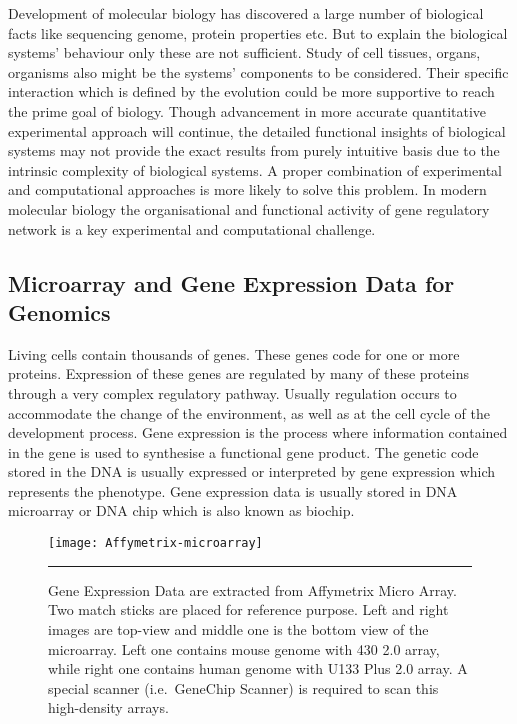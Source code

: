 Development of molecular biology has discovered a large number of biological facts like sequencing genome, protein properties etc. But to explain the biological systems' behaviour only these are not sufficient. Study of cell tissues, organs, organisms also might be the systems' components to be  considered. Their specific interaction which is defined by the evolution could be more supportive to reach the prime goal of biology. Though advancement in more accurate quantitative experimental approach will continue, the detailed functional insights of biological systems may not provide the exact results from purely intuitive basis due to the intrinsic complexity of biological systems. A proper combination of experimental and computational approaches is more likely to solve this problem. In modern molecular biology the organisational and functional activity of gene regulatory network is a key experimental and computational challenge.

\subsection{Microarray and Gene Expression Data for Genomics }
Living cells contain thousands of genes. These genes code for one or more proteins. Expression of these genes are regulated by many of these proteins through a very complex regulatory pathway. Usually regulation occurs to accommodate the change of the environment, as well as at the cell cycle of the development process. %
Gene expression is the process where information contained in the gene is used to synthesise a functional gene product. The genetic code stored in the DNA is usually expressed or interpreted by gene expression which represents the  phenotype. Gene expression data is usually stored in DNA microarray or DNA chip which is also known as biochip. 

\begin{figure}[htbp!]
	\centering
	\texttt{[image: Affymetrix-microarray]}
		\rule{35em}{0.5pt}
	\caption[Affymetrix Micro Array]{Gene Expression Data are extracted from Affymetrix Micro Array. Two match sticks are placed for reference purpose. Left and right images are top-view and middle one is the bottom view of the microarray. Left one contains mouse genome with 430 2.0 array, while right one contains human genome with U133 Plus 2.0 array. A special scanner (i.e.\ GeneChip Scanner) is required to scan this high-density arrays.}
	\label{fig:Affymetrix-microarray}
\end{figure}
 
